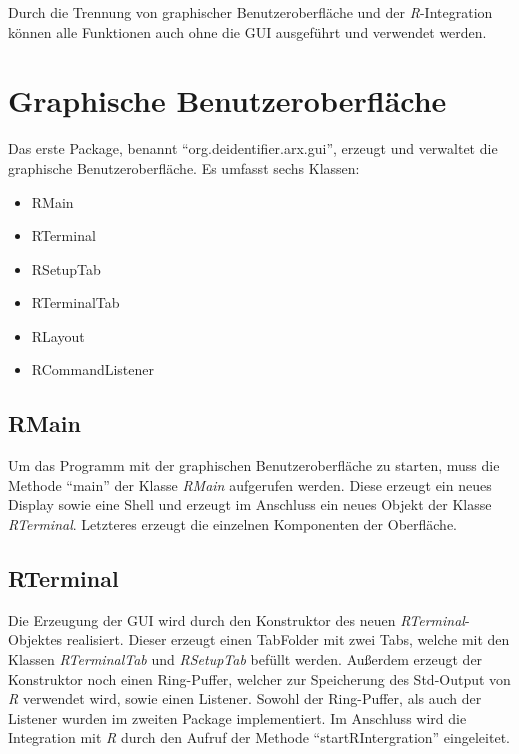 \documentclass[a4paper, 12pt]{report} %
\begin{document}
Durch die Trennung von graphischer Benutzeroberfläche und der \textit{R}-Integration können alle Funktionen auch ohne die GUI ausgeführt und verwendet werden.

\section{Graphische Benutzeroberfläche}

\begin{samepage}

Das erste Package, benannt "`org.deidentifier.arx.gui"', erzeugt und verwaltet die graphische Benutzeroberfläche. Es umfasst sechs Klassen:
\begin{itemize}
	\item RMain
	\item RTerminal
	\item RSetupTab
	\item RTerminalTab
	\item RLayout
	\item RCommandListener
\end{itemize}
\end{samepage}

\subsection{RMain}

Um das Programm mit der graphischen Benutzeroberfläche zu starten, muss die Methode "`main"' der Klasse \textit{RMain} aufgerufen werden. Diese erzeugt ein neues Display sowie eine Shell und erzeugt im Anschluss ein neues Objekt der Klasse \textit{RTerminal}.
Letzteres erzeugt die einzelnen Komponenten der Oberfläche.

\subsection{RTerminal}

Die Erzeugung der GUI wird durch den Konstruktor des neuen \textit{RTerminal}-Objektes realisiert. Dieser erzeugt einen TabFolder mit zwei Tabs, welche mit den Klassen \textit{RTerminalTab} und \textit{RSetupTab} befüllt werden.
Außerdem erzeugt der Konstruktor noch einen Ring-Puffer, welcher zur Speicherung des Std-Output von \textit{R} verwendet wird, sowie einen Listener. Sowohl der Ring-Puffer, als auch der Listener wurden im zweiten Package implementiert.
Im Anschluss wird die Integration mit \textit{R} durch den Aufruf der Methode "`startRIntergration"' eingeleitet.\\
\end{document}
